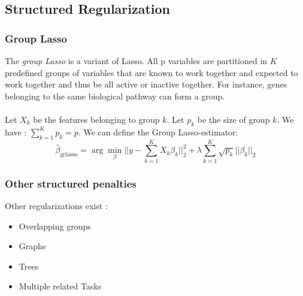 \documentclass[a4paper,12pt]{article}
\begin{document}
\subsection{Structured Regularization}
\subsubsection{Group Lasso}
The \emph{group Lasso} is a variant of Lasso. All p variables are partitioned in $K$ predefined groups of variables that are known to work together and expected to work together and thus be all active or inactive together. For instance, genes belonging to the same biological pathway can form a group.\\
~\\
Let $X_k$ be the features belonging to group $k$. Let $p_k$ be the size of group $k$. We have : $\sum_{k = 1}^K{p_k} = p$. We can define the Group Lasso-estimator:
\[ \hat{\beta}_\text{grlasso} = \arg \min_\beta ||y - \sum_{k = 1}^K{X_k\beta_k}||_2^2 + \lambda \sum_{k = 1}^K{\sqrt{p_k}||\beta_k||_2}\]

\subsubsection{Other structured penalties}
Other regularizations exist :
\begin{itemize}
\item Overlapping groups
\item Graphs
\item Trees
\item Multiple related Tasks
\end{itemize}
\end{document}
